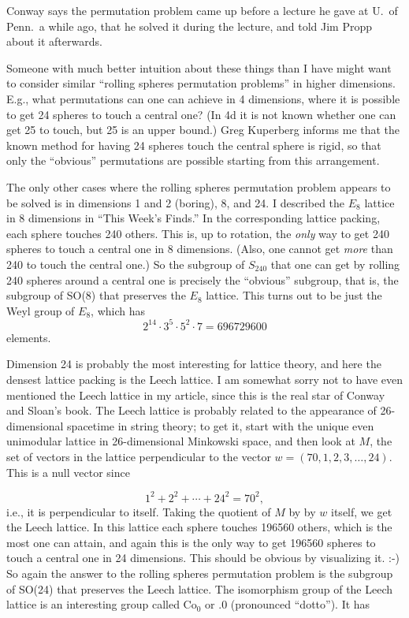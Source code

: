 Conway says the permutation problem came up before a lecture he gave at U.\ of Penn.\ a while ago, that he solved it during the lecture, and told Jim Propp about it afterwards.

Someone with much better intuition about these things than I have might want to consider similar ``rolling spheres permutation problems'' in higher dimensions. E.g., what permutations can one can achieve in 4 dimensions, where it is possible to get 24 spheres to touch a central one? (In 4d it is not known whether one can get 25 to touch, but 25 is an upper bound.) Greg Kuperberg informs me that the known method for having 24 spheres touch the central sphere is rigid, so that only the ``obvious'' permutations are possible starting from this arrangement.

The only other cases where the rolling spheres permutation problem appears to be solved is in dimensions 1 and 2 (boring), 8, and 24. I described the $E_8$ lattice in 8 dimensions in ``This Week's Finds.'' In the corresponding lattice packing, each sphere touches 240 others. This is, up to rotation, the \emph{only} way to get 240 spheres to touch a central one in 8 dimensions. (Also, one cannot get \emph{more} than 240 to touch the central one.) So the subgroup of $S_{240}$ that one can get by rolling 240 spheres around a central one is precisely the ``obvious'' subgroup, that is, the subgroup of SO(8) that preserves the $E_8$ lattice. This turns out to be just the Weyl group of $E_8$, which has
\[2^{14} \cdot 3^5 \cdot 5^2 \cdot 7 = 696729600\]
elements.

Dimension 24 is probably the most interesting for lattice theory, and here the densest lattice packing is the Leech lattice. I am somewhat sorry not to have even mentioned the Leech lattice in my article, since this is the real star of Conway and Sloan's book. The Leech lattice is probably related to the appearance of 26-dimensional spacetime in string theory; to get it, start with the unique even unimodular lattice in 26-dimensional Minkowski space, and then look at $M$, the set of vectors in the lattice perpendicular to the vector $w = (70,1,2,3,\dotsc,24)$. This is a null vector since

\[1^2 + 2^2 + \dotsb + 24^2 = 70^2,\]
%
i.e., it is perpendicular to itself. Taking the quotient of $M$ by by $w$ itself, we get the Leech lattice. In this lattice each sphere touches 196560 others, which is the most one can attain, and again this is the only way to get 196560 spheres to touch a central one in 24 dimensions. This should be obvious by visualizing it. :-) So again the answer to the rolling spheres permutation problem is the subgroup of SO(24) that preserves the Leech lattice. The isomorphism group of the Leech lattice is an interesting group called Co${}_0$ or .0 (pronounced ``dotto''). It has

